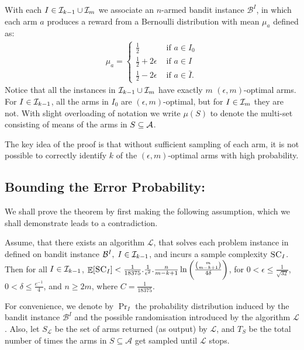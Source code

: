 With each $I \in \mathcal{I}_{k-1} \cup \mathcal{I}_m$ we associate an $n$-armed bandit instance $\mathcal{B}^I$,
in which each arm $a$ produces a reward from a Bernoulli distribution with mean
$\mu_a$ defined as:
  \begin{align}
   \mu_a = \begin{cases}
            \frac{1}{2} & \text{ if } a \in I_0\\
        \frac{1}{2} + 2\epsilon & \text{ if } a \in I\\
        \frac{1}{2} - 2\epsilon & \text{ if } a \in \bar{I}.
           \end{cases}
  \end{align}
 Notice that all the instances in $ \mathcal{I}_{k-1} \cup \mathcal{I}_m$ have exactly $m$ $(\epsilon, m)$-optimal
 arms. For $I \in \mathcal{I}_{k-1}$, all the arms in $I_0$ are $(\epsilon, m)$-optimal, but for 
 $I \in \mathcal{I}_m$ they are not. With slight overloading of notation we write 
$\mu(S)$ to denote the multi-set consisting of means of the arms in $S\subseteq \mathcal{A}$.


 The key idea of the proof is that without sufficient  sampling
 of each arm, it is not possible to correctly identify $k$ of the $(\epsilon, m)$-optimal
 arms with high probability.
 
\subsection{Bounding the Error Probability:}
We shall prove the theorem by first making the following assumption, which we
shall demonstrate leads to a contradiction.

\begin{assumption}\label{asmp:contra} 
Assume, that there exists an algorithm $\mathcal{L}$, that solves each problem instance %
in \QFK defined on bandit instance $\mathcal{B}^I,\; I \in \mathcal{I}_{k-1}$,
 and incurs a sample complexity $\textsc{SC}_I$. Then for all $I \in \mathcal{I}_{k-1}$, 
 $\Ex{\textsc{SC}_I} < \frac{1}{18375}. \frac{1}{\epsilon^2}. \frac{n}{m-k+1}\ln\left(\frac{\binom{m}{m-k+1}}{4\delta}\right)$,
 for $0< \epsilon \leq \frac{1}{\sqrt{32}}$, $0 < \delta \leq \frac{e^{-1}}{4}$, and $n \geq 2m$, where $C = \frac{1}{18375}$.
\end{assumption}

For convenience, we denote by $\Pr_I$ the probability distribution induced by
the bandit instance $\mathcal{B}^I$ and the possible randomisation introduced
by the algorithm $\mathcal{L}$. Also, let $S_{\mathcal{L}}$ be the set of arms returned (as output) by
$\mathcal{L}$, and $T_S$ be the total number of times the arms in  $S \subseteq \mathcal{A}$ get sampled
until $\mathcal{L}$ stops.

